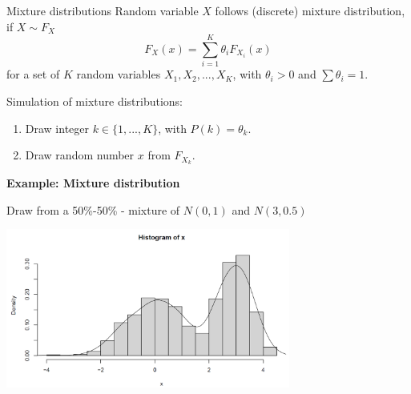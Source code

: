 \documentclass[11pt,compress,t,notes=noshow, xcolor=table]{beamer}
\begin{document}
\begin{vbframe}{Mixture distributions}
Random variable $X$ follows (discrete) mixture distribution, if $X \sim F_X$
$$
F_X(x) = \sum_{i=1}^K \theta_i F_{X_i}(x)
$$
for a set of $K$ random variables $X_1, X_2, ..., X_K$, with $\theta_i >0$ and $\sum\theta_i=1$.

\lz

Simulation of mixture distributions:
\begin{enumerate}
\item Draw integer $k \in \{1,...,K\}$, with $P(k)=\theta_k$.
\item Draw random number $x$ from $F_{X_k}$.
\end{enumerate}

\framebreak

\textbf{Example: Mixture distribution}

\lz

Draw from a 50\%-50\% - mixture of $N(0,1)$ and $N(3,0.5)$


\begin{center}
\includegraphics[width =0.7\textwidth]{figure_man/mixdist.png}
\end{center}



\end{vbframe}
\end{document}
